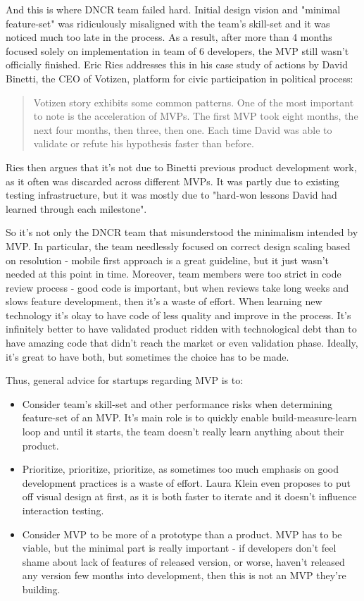 \documentclass{article}
\begin{document}
And this is where DNCR team failed hard. Initial design vision and "minimal feature-set" was ridiculously misaligned with the team's skill-set and it was noticed much too late in the process. As a result, after more than 4 months focused solely on implementation in team of 6 developers, the MVP still wasn't officially finished. Eric Ries \cite{ries2011lean} addresses this in his case study of actions by David Binetti, the CEO of Votizen, platform for civic participation in political process:
\begin{quote}
Votizen story exhibits some common patterns. One of the most important to note is the acceleration of MVPs. The first MVP took eight months, the next four months, then three, then one. Each time David was able to validate or refute his hypothesis faster than before. 
\end{quote}
Ries then argues that it's not due to Binetti previous product development work, as it often was discarded across different MVPs. It was partly due to existing testing infrastructure, but it was mostly due to "hard-won lessons David had learned through each milestone".

So it's not only the DNCR team that misunderstood the minimalism intended by MVP. In particular, the team needlessly focused on correct design scaling based on resolution - mobile first approach is a great guideline, but it just wasn't needed at this point in time. Moreover, team members were too strict in code review process - good code is important, but when reviews take long weeks and slows feature development, then it's a waste of effort. When learning new technology it's okay to have code of less quality and improve in the process. It's infinitely better to have validated product ridden with technological debt than to have amazing code that didn't reach the market or even validation phase. Ideally, it's great to have both, but sometimes the choice has to be made.

Thus, general advice for startups regarding MVP is to:
\begin{itemize}
\item Consider team's skill-set and other performance risks when determining feature-set of an MVP. It's main role is to quickly enable build-measure-learn loop and until it starts, the team doesn't really learn anything about their product.
\item Prioritize, prioritize, prioritize, as sometimes too much emphasis on good development practices is a waste of effort. Laura Klein \cite{klein2013ux} even proposes to put off visual design at first, as it is both faster to iterate and it doesn't influence interaction testing.
\item Consider MVP to be more of a prototype than a product. MVP has to be viable, but the minimal part is really important - if developers don't feel shame about lack of features of released version, or worse, haven't released any version few months into development, then this is not an MVP they're building.
\end{itemize}
\end{document}
